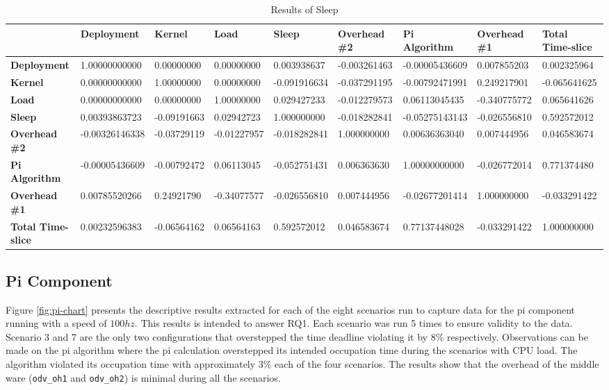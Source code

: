 \clearpage
{}
\begin{landscape}
\begin{table}[]
\centering
\caption{Results of Sleep}
\label{tab:corrmatrix}
\begin{tabular}{l|KKKKKKKK}
 & \textbf{Deployment} & \textbf{Kernel} & \textbf{Load} & \textbf{Sleep} & \textbf{Overhead \#2} & \textbf{Pi Algorithm} & \textbf{Overhead \#1} & \textbf{Total Time-slice} \\ \hline
\textbf{Deployment} & 1.00000000000 & 0.00000000 & 0.00000000 & 0.003938637 & -0.003261463 & -0.00005436609 & 0.007855203 & 0.002325964 \\
\textbf{Kernel} & 0.00000000000 & 1.00000000 & 0.00000000 & -0.091916634 & -0.037291195 & -0.00792471991 & 0.249217901 & -0.065641625 \\
\textbf{Load} & 0.00000000000 & 0.00000000 & 1.00000000 & 0.029427233 & -0.012279573 & 0.06113045435 & -0.340775772 & 0.065641626 \\
\textbf{Sleep} & 0.00393863723 & -0.09191663 & 0.02942723 & 1.000000000 & -0.018282841 & -0.05275143143 & -0.026556810 & 0.592572012 \\
\textbf{Overhead \#2} & -0.00326146338 & -0.03729119 & -0.01227957 & -0.018282841 & 1.000000000 & 0.00636363040 & 0.007444956 & 0.046583674 \\
\textbf{Pi Algorithm} & -0.00005436609 & -0.00792472 & 0.06113045 & -0.052751431 & 0.006363630 & 1.00000000000 & -0.026772014 & 0.771374480 \\
\textbf{Overhead \#1} & 0.00785520266 & 0.24921790 & -0.34077577 & -0.026556810 & 0.007444956 & -0.02677201414 & 1.000000000 & -0.033291422 \\
\textbf{Total Time-slice} & 0.00232596383 & -0.06564162 & 0.06564163 & 0.592572012 & 0.046583674 & 0.77137448028 & -0.033291422 & 1.000000000 \\
\end{tabular}
\end{table}
\end{landscape}
\clearpage



\subsection{Pi Component}


Figure \ref{fig:pi-chart} presents the descriptive results extracted for each of the eight scenarios run to capture data for the pi component running with a speed of $100hz$. This results is intended to answer RQ1. Each scenario was run 5 times to ensure validity to the data. Scenario 3 and 7 are the only two configurations that overstepped the time deadline violating it by 8\% respectively. Observations can be made on the pi algorithm where the pi calculation overstepped its intended occupation time during the scenarios with CPU load. The algorithm violated its occupation time with approximately 3\% each of the four scenarios. The results show that the overhead of the middle ware (\texttt{odv\_oh1} and \texttt{odv\_oh2}) is minimal during all the scenarios. 

